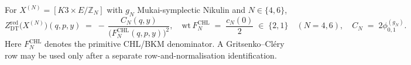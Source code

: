 \begin{conjecture}
\label{thm:k3e-orbifold-DT-N46}
For $X^{(N)} = [K3 \times E / \mathbb{Z}_N]$ with $g_N$ Mukai-symplectic Nikulin and $N \in \{4, 6\}$,
\begin{equation}
\label{eq:k3e-DTred-N46}
Z^{\mathrm{red}}_{\mathrm{DT}}\bigl(X^{(N)}\bigr)(q, p, y) \;=\; -\,\frac{C_N(q, y)}{\bigl(F^{\mathrm{CHL}}_N(q, p, y)\bigr)^{2}}, \quad \mathrm{wt}\,F^{\mathrm{CHL}}_N \;=\; \frac{c_N(0)}{2} \;\in\; \{2, 1\} \quad (N = 4, 6), \quad C_N \;=\; 2\phi^{(g_N)}_{0, 1}.
\end{equation}
Here $F^{\mathrm{CHL}}_N$ denotes the primitive CHL/BKM denominator. A Gritsenko--Cl\'ery row may be used only after a separate row-and-normalisation identification.
\end{conjecture}

